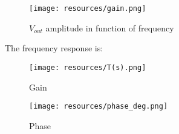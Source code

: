 \begin{figure} [!htb] 
  \texttt{[image: resources/gain.png]}
  \caption{$V_{out}$ amplitude in function of frequency} 
  \label{fig:theoplots}
  \endminipage\hfill
\end{figure}

\FloatBarrier

The frequency response is:

\begin{figure} [!htb] 
  \texttt{[image: resources/T(s).png]}
  \caption{Gain} 
  \label{fig:theoplots}
  \endminipage\hfill
\end{figure}

\FloatBarrier


\FloatBarrier

\begin{figure} [!htb] 
  \texttt{[image: resources/phase\_deg.png]}
  \caption{Phase} 
  \label{fig:theoplots}
  \endminipage\hfill
\end{figure}

\FloatBarrier




